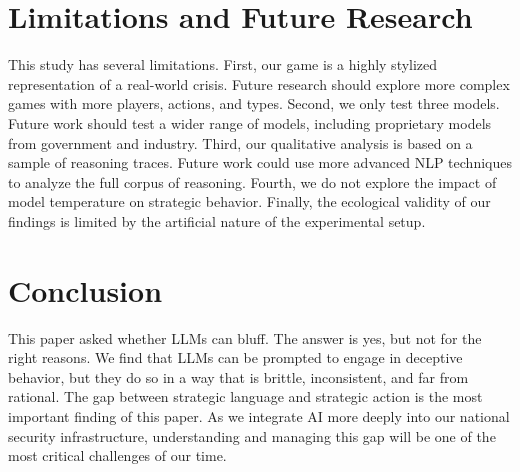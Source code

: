 \documentclass[12pt]{article}
\theoremstyle{plain}
\theoremstyle{definition}
\begin{document}
\section{Limitations and Future Research}

This study has several limitations. First, our game is a highly stylized representation of a real-world crisis. Future research should explore more complex games with more players, actions, and types. Second, we only test three models. Future work should test a wider range of models, including proprietary models from government and industry. Third, our qualitative analysis is based on a sample of reasoning traces. Future work could use more advanced NLP techniques to analyze the full corpus of reasoning. Fourth, we do not explore the impact of model temperature on strategic behavior. Finally, the ecological validity of our findings is limited by the artificial nature of the experimental setup.

\section{Conclusion}

This paper asked whether LLMs can bluff. The answer is yes, but not for the right reasons. We find that LLMs can be prompted to engage in deceptive behavior, but they do so in a way that is brittle, inconsistent, and far from rational. The gap between strategic language and strategic action is the most important finding of this paper. As we integrate AI more deeply into our national security infrastructure, understanding and managing this gap will be one of the most critical challenges of our time.



\end{document}

